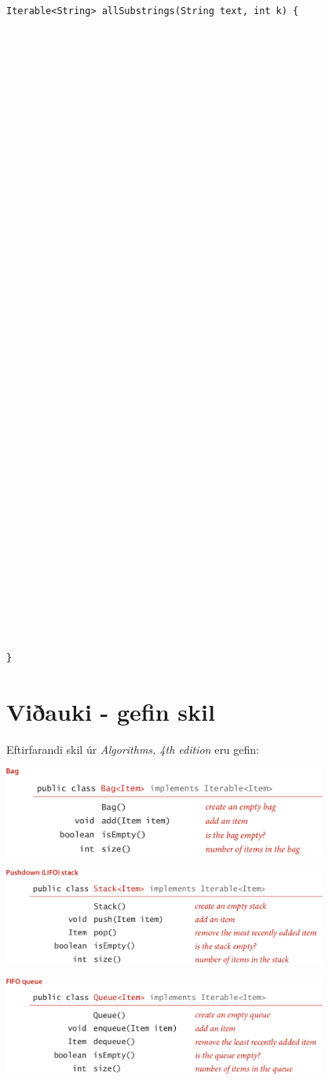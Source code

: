 \documentclass[addpoints]{exam}
\begin{document}
\begin{questions}
	\begin{verbatim}
Iterable<String> allSubstrings(String text, int k) {









































}
\end{verbatim}



	\newpage
	\section{Viðauki - gefin skil}
	Eftirfarandi skil úr \emph{Algorithms, 4th edition} eru gefin:
	\begin{center}
		\includegraphics[width=0.8\textwidth]{Pics/API-Bag}

		\vspace{0.5cm}

		\includegraphics[width=0.8\textwidth]{Pics/API-Stack}

		\vspace{0.5cm}

		\includegraphics[width=0.8\textwidth]{Pics/API-Queue}


\end{center}
\end{questions}
\end{document}
